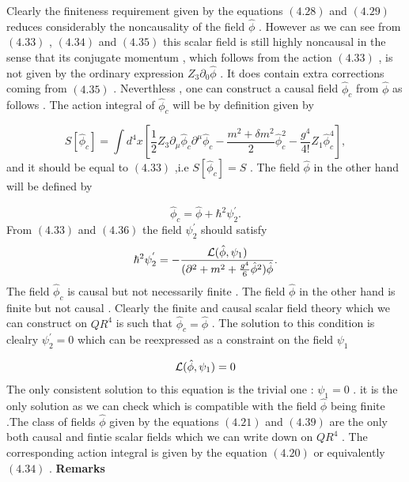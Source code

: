\documentclass[a4paper,12pt]{article}
\begin{document}
Clearly the finiteness requirement given by the equations
$(4.28)$ and $(4.29)$ reduces considerably the noncausality of the
field $\hat{\phi}$ . However as we can see from $ (4.33)$ , $(4.34)$ and $(4.35)$ this
scalar field is still highly noncausal in the sense that its conjugate momentum , which follows from the action $(4.33)$ , is not given by the ordinary expression $Z_3{\partial}_0{\hat{\phi}}$ . It does contain extra corrections coming from $(4.35)$ . Neverthless , one can construct a causal
field ${\hat{\phi}}_c$ from ${\hat{\phi}}$ as follows . The action
integral of ${\hat{\phi}}_c$ will be by definition given by

\begin{equation}
 S[{\hat{\phi}}_c]=\int d^4x[\frac{1}{2}Z_3{\partial}_{\mu}{\hat{\phi}}_c{\partial}^{\mu}{\hat{\phi}}_c -\frac{m^2+{\delta}m^2}{2}
 {\hat{\phi}}_c^2 - \frac{g^4}{4!}Z_1{\hat{\phi}}_c^4],
\end{equation}
and it should be equal to $(4.33)$ ,i.e $S[{\hat{\phi}}_c]=S$ .
The field ${\hat{\phi}}$ in the other hand will be defined by

\begin{equation}
{\hat{\phi}}_c={\hat{\phi}} + {\hbar}^2{\psi}_2^{'}.
\end{equation}
From $(4.33)$ and $(4.36)$ the field ${\psi}_2^{'}$ should satisfy
\begin{equation}
{\hbar}^2{\psi}^{'}_2=-\frac{{\cal
L}(\hat{\phi},{\psi}_1)}{({\partial}^2+m^2+\frac{g^4}{6}{\hat{\phi}}^2){\hat{\phi}}}.
\end{equation}
The field ${\hat{\phi}}_c$ is causal but not necessarily finite .
The field $\hat{\phi}$  in the other hand is finite but not causal
. Clearly the finite and causal scalar field theory which we can
construct on $QR^4$ is such that ${\hat{\phi}}_c={\hat{\phi}}$ .
The solution to this condition is clealry ${\psi}_2^{'}=0$ which
can be reexpressed as a constraint on the field ${\psi}_1$

\begin{eqnarray}
{\cal
L}(\hat{\phi},{\psi}_1)=0
\end{eqnarray}
The only consistent solution to this equation is the trivial one : $\psi_1=0$ . it is the only solution as we can check which is compatible with the field ${\hat{\phi}}$ being finite .The class of fields ${\hat{\phi}}$ given by the equations $(4.21)$
and $(4.39)$ are the only both causal and fintie scalar fields
which we can write down on $QR^4$ . The corresponding action
integral is given by the
equation $(4.20)$ or equivalently
$(4.34)$ .
\newpage
\vskip 5mm
\noindent
{\bf Remarks} \vskip 5mm
\noindent
\end{document}
